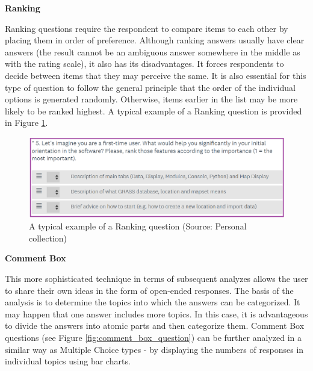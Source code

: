 \documentclass[a4paper,10pt,twoside]{article}
\begin{document}
\newpage
\vspace*{-1cm}
\bigskip
\noindent \textbf {Ranking}

\noindent Ranking questions require the respondent to compare items to
each other by placing them in order of preference. Although ranking
answers usually have clear answers (the result cannot be an ambiguous
answer somewhere in the middle as with the rating scale), it also has
its disadvantages. It forces respondents to decide between items that
they may perceive the same. It is also essential for this type of
question to follow the general principle that the order of the
individual options is generated randomly. Otherwise, items earlier in
the list may be more likely to be ranked highest. A typical example of
a Ranking question is provided in Figure \ref{fig:ranking_question}.

\vspace{0.3cm}
\begin{figure}[hbt!] 
\begin{center}
\includegraphics[width=16cm]{../pictures/ranking_question.png} 
\caption[A typical example of a Ranking question]{A typical example of a Ranking question (Source: Personal collection)}
\label{fig:ranking_question}
\end{center}
\end{figure}

\smallskip
\vspace*{-0.5cm}
\noindent \textbf {Comment Box}

\noindent This more sophisticated technique in terms of subsequent
analyzes allows the user to share their own ideas in the form of
open-ended responses. The basis of the analysis is to determine the
topics into which the answers can be categorized. It may happen that
one answer includes more topics. In this case, it is advantageous to
divide the answers into atomic parts and then categorize them. Comment
Box questions (see Figure \ref{fig:comment_box_question}) can be
further analyzed in a similar way as Multiple Choice types - by
displaying the numbers of responses in individual topics using bar
charts.
\end{document}
